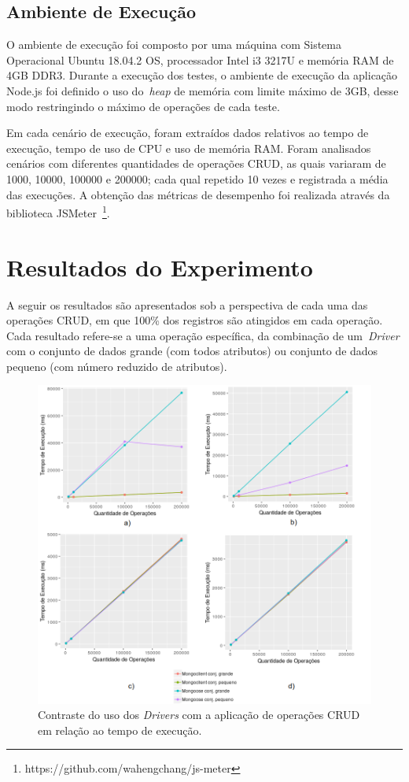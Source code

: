 \documentclass[12pt]{article}
\begin{document}
\subsection{Ambiente de Execução}

O ambiente de execução foi composto por uma máquina com Sistema Operacional Ubuntu 18.04.2 OS, processador Intel i3 3217U e memória RAM de 4GB DDR3. 
Durante a execução dos testes, o ambiente de execução da aplicação Node.js foi definido o uso do~\emph{heap} de memória com limite máximo de 3GB, desse modo restringindo o máximo de operações de cada teste.

Em cada cenário de execução, foram extraídos dados relativos ao tempo de execução, tempo de uso de CPU e uso de memória RAM. 
Foram analisados cenários com diferentes quantidades de operações CRUD, as quais variaram de 1000, 10000, 100000 e 200000; cada qual repetido 10 vezes e registrada a média das execuções. A obtenção das métricas de desempenho foi realizada através da biblioteca JSMeter~\footnote{https://github.com/wahengchang/js-meter}. 

\section{Resultados do Experimento}
\label{section:resultados}

A seguir os resultados são apresentados sob a perspectiva de cada uma das operações CRUD, em que 100\% dos registros são atingidos em cada operação. 
Cada resultado refere-se a uma operação específica, da combinação de um~\emph{Driver} com o conjunto de dados grande (com todos atributos) ou conjunto de dados pequeno (com número reduzido de atributos).

\begin{figure}[!ht]
\centering
\includegraphics[width=\textwidth]{images/time}
\caption{Contraste do uso dos \emph{Drivers} com a aplicação de operações CRUD em relação ao tempo de execução.}
\label{fig:time}
\end{figure}
\end{document}
